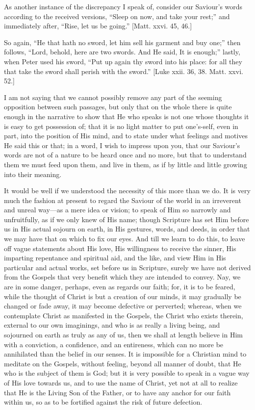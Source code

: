 As another instance of the discrepancy I speak of, consider our
Saviour's words according to the received versions, ``Sleep on
now, and take your rest;'' and immediately after, ``Rise, let
us be going.'' [Matt. xxvi. 45, 46.]

So again, ``He that hath no sword, let him sell his garment and
buy one;'' then follows, ``Lord, behold, here are two swords.
And He said, It is enough;'' lastly, when Peter used his sword,
``Put up again thy sword into his place: for all they that take
the sword shall perish with the sword.'' [Luke xxii. 36, 38. Matt.
xxvi. 52.]

I am not saying that we cannot possibly remove any part of the
seeming opposition between such passages, but only that on the whole
there is quite enough in the narrative to show that He who speaks is
not one whose thoughts it is easy to get possession of; that it is no
light matter to put one's-self, even in part, into the position of His
mind, and to state under what feelings and motives He said this or
that; in a word, I wish to impress upon you, that our Saviour's words
are not of a nature to be heard once and no more, but that to
understand them we must feed upon them, and live in them, as if by
little and little growing into their meaning.

It would be well if we understood the necessity of this more than
we do. It is very much the fashion at present to regard the Saviour of
the world in an irreverent and unreal way—as a mere idea or vision;
to speak of Him so narrowly and unfruitfully, as if we only knew of
His name; though Scripture has set Him before us in His actual sojourn
on earth, in His gestures, words, and deeds, in order that we may have
that on which to fix our eyes. And till we learn to do this, to leave
off vague statements about His love, His willingness to receive the
sinner, His imparting repentance and spiritual aid, and the like, and
view Him in His particular and actual works, set before us in
Scripture, surely we have not derived from the Gospels that very
benefit which they are intended to convey. Nay, we are in some danger,
perhaps, even as regards our faith; for, it is to be feared, while the
thought of Christ is but a creation of our minds, it may gradually be
changed or fade away, it may become defective or perverted; whereas,
when we contemplate Christ as manifested in the Gospels, the Christ
who exists therein, external to our own imaginings, and who is as
really a living being, and sojourned on earth as truly as any of us,
then we shall at length believe in Him with a conviction, a
confidence, and an entireness, which can no more be annihilated than
the belief in our senses. It is impossible for a Christian mind to
meditate on the Gospels, without feeling, beyond all manner of doubt,
that He who is the subject of them is God; but it is very possible to
speak in a vague way of His love towards us, and to use the name of
Christ, yet not at all to realize that He is the Living Son of the
Father, or to have any anchor for our faith within us, so as to be
fortified against the risk of future defection.

